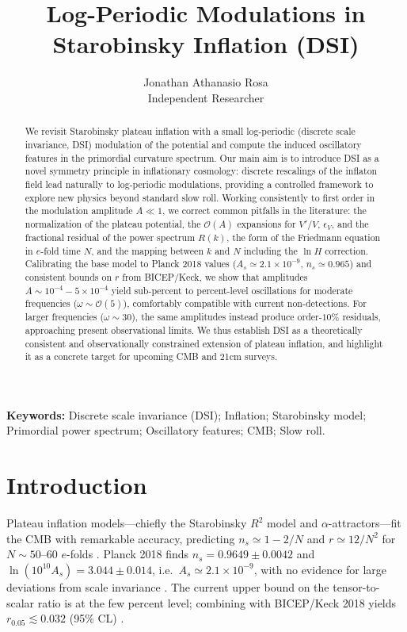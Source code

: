 \documentclass[12pt]{article}
\title{Log-Periodic Modulations in Starobinsky Inflation (DSI)}
\author{Jonathan Athanasio Rosa\\[2pt]
\normalsize Independent Researcher}
\date{}
\begin{document}
\maketitle

\begin{abstract}
We revisit Starobinsky plateau inflation with a small log-periodic (discrete scale invariance, DSI) modulation of the potential and compute the induced oscillatory features in the primordial curvature spectrum. Our main aim is to introduce DSI as a novel symmetry principle in inflationary cosmology: discrete rescalings of the inflaton field lead naturally to log-periodic modulations, providing a controlled framework to explore new physics beyond standard slow roll. Working consistently to first order in the modulation amplitude $A\ll 1$, we correct common pitfalls in the literature: the normalization of the plateau potential, the $\mathcal{O}(A)$ expansions for $V'/V$, $\epsilon_V$, and the fractional residual of the power spectrum $R(k)$, the form of the Friedmann equation in $e$-fold time $N$, and the mapping between $k$ and $N$ including the $\ln H$ correction. Calibrating the base model to Planck 2018 values ($A_s\simeq2.1\times10^{-9}$, $n_s\simeq0.965$) and consistent bounds on $r$ from BICEP/Keck, we show that amplitudes $A\sim10^{-4}\!-\!5\times10^{-4}$ yield sub-percent to percent-level oscillations for moderate frequencies ($\omega\sim\mathcal O(5)$), comfortably compatible with current non-detections. For larger frequencies ($\omega\sim 30$), the same amplitudes instead produce order-$10\%$ residuals, approaching present observational limits. We thus establish DSI as a theoretically consistent and observationally constrained extension of plateau inflation, and highlight it as a concrete target for upcoming CMB and 21cm surveys.
\end{abstract}


\bigskip
\noindent\textbf{Keywords:} Discrete scale invariance (DSI); Inflation; Starobinsky model; Primordial power spectrum; Oscillatory features; CMB; Slow roll.

\section{Introduction}

Plateau inflation models---chiefly the Starobinsky $R^2$ model and $\alpha$-attractors---fit the CMB with remarkable accuracy, predicting $n_s \simeq 1-2/N$ and $r\simeq 12/N^2$ for $N\sim 50$--$60$ $e$-folds \cite{Planck2018Inflation,Planck2018Params,KalloshLindeRoest2013,Starobinsky1980,Starobinsky1983}. Planck 2018 finds $n_s=0.9649\pm 0.0042$ and $\ln(10^{10}A_s)=3.044\pm0.014$, i.e.\ $A_s\simeq 2.1\times10^{-9}$, with no evidence for large deviations from scale invariance \cite{Planck2018Params}. The current upper bound on the tensor-to-scalar ratio is at the few percent level; combining with BICEP/Keck 2018 yields $r_{0.05}\lesssim 0.032$ (95\% CL) \cite{Paoletti2022}.
\end{document}
